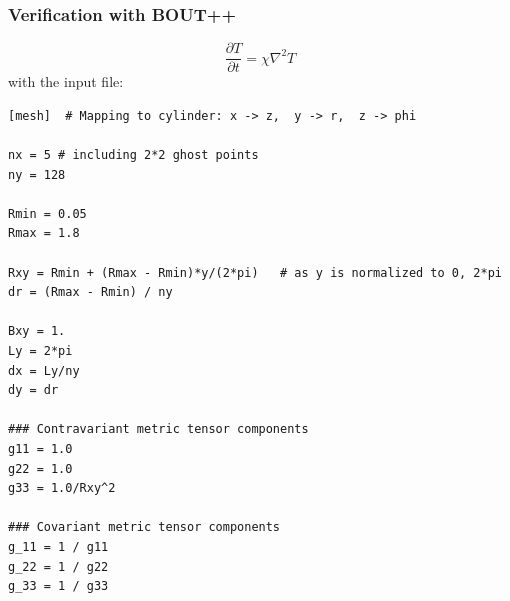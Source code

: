 \documentclass[11pt, oneside]{article}
\begin{document}
\subsubsection{Verification with BOUT++}
\begin{equation}
\frac{\partial T}{\partial t} = \chi \nabla^2 T
\end{equation}
with the input file:
\begin{lstlisting}
[mesh]  # Mapping to cylinder: x -> z,  y -> r,  z -> phi

nx = 5 # including 2*2 ghost points
ny = 128

Rmin = 0.05
Rmax = 1.8

Rxy = Rmin + (Rmax - Rmin)*y/(2*pi)   # as y is normalized to 0, 2*pi
dr = (Rmax - Rmin) / ny

Bxy = 1.
Ly = 2*pi
dx = Ly/ny
dy = dr

### Contravariant metric tensor components
g11 = 1.0
g22 = 1.0
g33 = 1.0/Rxy^2

### Covariant metric tensor components
g_11 = 1 / g11
g_22 = 1 / g22
g_33 = 1 / g33
\end{lstlisting}
\end{document}

